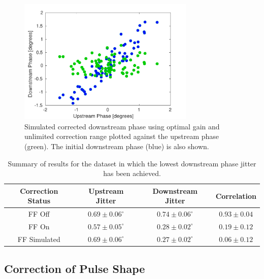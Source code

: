 \begin{figure}
  \centering
  \includegraphics[width=0.75\textwidth]{Figures/feedforward/BestFF_Simulated}
  \caption{Simulated corrected downstream phase using optimal gain and unlimited correction range plotted against the upstream phase (green). The initial downstream phase (blue) is also shown. }
  \label{f:BestFF_Simulated}
\end{figure}


\begin{table}
  \begin{center}
    \begin{tabular}{| c | c | c | c |}
	   \hline
       Correction Status & Upstream Jitter & Downstream Jitter & Correlation \\ \hline
       FF Off & \(0.69\pm0.06^\circ\) & \(0.74\pm0.06^\circ\) & \(0.93\pm0.04\) \\
	   FF On & \(0.57\pm0.05^\circ\) & \(0.28\pm0.02^\circ\) & \(0.19\pm0.12\) \\
	   FF Simulated & \(0.69\pm0.06^\circ\) & \(0.27\pm0.02^\circ\) & \(0.06\pm0.12\) \\ \hline
    \end{tabular}
    \caption{Summary of results for the dataset in which the lowest downstream phase jitter has been achieved.}
  	\label{t:BestFF}
  \end{center}
\end{table}

\subsection{Correction of Pulse Shape}
\label{ss:bestPulseShape}

